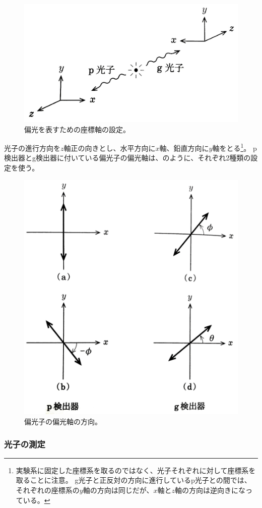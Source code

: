 \documentclass[10pt,b5paper,papersize,dvipdfmx]{jsbook}
\begin{document}
\begin{figure}[ht]
  \centering
  \includegraphics[width=.5\textwidth]{nkym/fig/zahyou-kei.jpeg}
  \caption{偏光を表すための座標軸の設定。} %
  \label{fig:zahyou-jiku}
\end{figure}

光子の進行方向を$z$軸正の向きとし、水平方向に$x$軸、鉛直方向に$y$軸をとる\footnote{
  実験系に固定した座標系を取るのではなく、光子それぞれに対して座標系を取ることに注意。
  g光子と正反対の方向に進行しているp光子との間では、それぞれの座標系の$y$軸の方向は同じだが、$x$軸と$z$軸の方向は逆向きになっている。
}。
p検出器とg検出器に付いている偏光子の偏光軸は、のように、それぞれ2種類の設定を使う。

\begin{figure}[ht]
  \centering
  \includegraphics[width=.5\textwidth]{nkym/fig/henkou-jiku.jpeg}
  \caption{偏光子の偏光軸の方向。} %
  \label{fig:henkou-jiku}
\end{figure}

%
\subsubsection{光子の測定} %
\end{document}
